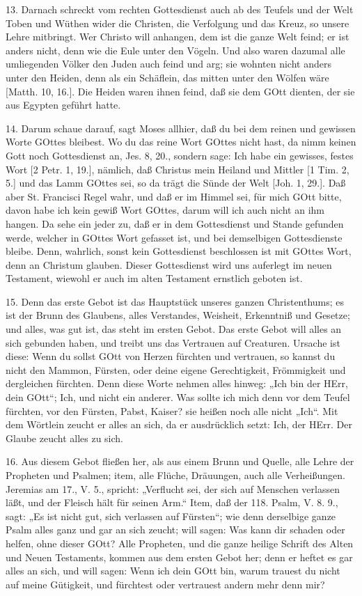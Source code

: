 13. Darnach schreckt vom rechten Gottesdienst auch ab des Teufels und der Welt Toben und Wüthen wider die Christen, die Verfolgung und das Kreuz, so unsere Lehre mitbringt. Wer Christo will anhangen, dem ist die ganze Welt feind; er ist anders nicht, denn wie die Eule unter den Vögeln. Und also waren dazumal alle umliegenden Völker den Juden auch feind und arg; sie wohnten nicht anders unter den Heiden, denn als ein Schäflein, das mitten unter den Wölfen wäre [Matth. 10, 16.]. Die Heiden waren ihnen feind, daß sie dem GOtt dienten, der sie aus Egypten geführt hatte.

14. Darum schaue darauf, sagt Moses allhier, daß du bei dem reinen und gewissen Worte GOttes bleibest. Wo du das reine Wort GOttes nicht hast, da nimm keinen Gott noch Gottesdienst an, Jes. 8, 20., sondern sage: Ich habe ein gewisses, festes Wort [2 Petr. 1, 19.], nämlich, daß Christus mein Heiland und Mittler [1 Tim. 2, 5.] und das Lamm GOttes sei, so da trägt die Sünde der Welt [Joh. 1, 29.]. Daß aber St. Francisci Regel wahr, und daß er im Himmel sei, für mich GOtt bitte, davon habe ich kein gewiß Wort GOttes, darum will ich auch nicht an ihm hangen. Da sehe ein
jeder zu, daß er in dem Gottesdienst und Stande gefunden werde, welcher in GOttes Wort gefasset ist, und bei demselbigen Gottesdienste bleibe. Denn, wahrlich, sonst kein Gottesdienst beschlossen ist mit GOttes Wort, denn an Christum glauben. Dieser Gottesdienst wird uns auferlegt im neuen Testament, wiewohl er auch im alten Testament ernstlich geboten ist.

15. Denn das erste Gebot ist das Hauptstück unseres ganzen Christenthums; es ist der Brunn des Glaubens, alles Verstandes, Weisheit, Erkenntniß und Gesetze; und alles, was gut ist, das steht im ersten Gebot. Das erste Gebot will alles an sich gebunden haben, und treibt uns das Vertrauen auf Creaturen. Ursache ist diese: Wenn du sollst GOtt von Herzen fürchten und vertrauen, so kannst du nicht den Mammon, Fürsten, oder deine eigene Gerechtigkeit, Frömmigkeit und dergleichen fürchten. Denn diese Worte nehmen alles hinweg: „Ich bin der HErr, dein GOtt“; Ich, und nicht ein anderer. Was sollte ich mich denn vor dem Teufel fürchten, vor den Fürsten, Pabst, Kaiser? sie heißen noch alle nicht „Ich“. Mit dem Wörtlein zeucht er alles an sich, da er ausdrücklich setzt: Ich, der HErr. Der Glaube zeucht alles zu sich.

16. Aus diesem Gebot fließen her, als aus einem Brunn und Quelle, alle Lehre der Propheten und Psalmen; item, alle Flüche, Dräuungen, auch alle Verheißungen. Jeremias am 17., V. 5., spricht: „Verflucht sei, der sich auf Menschen verlassen läßt, und der Fleisch hält für seinen Arm.“ Item, daß der 118. Psalm, V. 8. 9., sagt: „Es ist nicht gut, sich verlassen auf Fürsten“; wie denn derselbige ganze Psalm alles ganz und gar an sich zeucht; will sagen: Was kann dir schaden oder helfen, ohne dieser GOtt? Alle Propheten, und die ganze heilige Schrift des Alten und Neuen Testaments, kommen aus dem ersten Gebot her; denn er heftet es gar alles an sich, und will sagen: Wenn ich dein GOtt bin, warum trauest du nicht auf meine Gütigkeit, und fürchtest oder vertrauest andern mehr denn mir?

